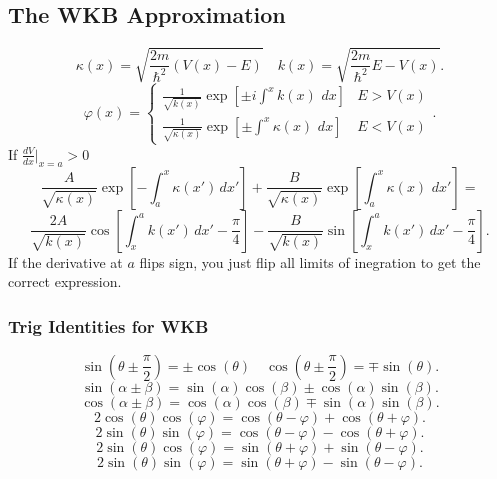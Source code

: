 \documentclass{article}
\begin{document}
  \subsection*{The WKB Approximation}
    \[
    \kappa(x) = \sqrt{\frac{2m}{\hbar^2}(V(x) - E)} \quad
    k(x) = \sqrt{\frac{2m}{\hbar^2} E - V(x)}
    .\]    
    \[
      \varphi(x) = 
      \begin{cases}
        \frac{1}{\sqrt{k(x)}} \exp[\pm i \int^x k(x)\,\,dx ]& E > V(x) \\
        \frac{1}{\sqrt{\kappa(x)}} \exp[\pm \int^x \kappa(x) \,\,dx] & E < V(x)
      \end{cases}
    .\] 
    If $\frac{d V}{dx}|_{x=a} > 0$ 
    \[
      \frac{A}{\sqrt{\kappa(x)}}\exp\left[ -\int_a^x \kappa(x')\,dx' \right] +
      \frac{B}{\sqrt{\kappa(x)}}\exp\left[\int_a^x \kappa(x)\,\,dx'\right] =
    \] 
    \[
      \frac{2A}{\sqrt{k(x)}}\cos\left[\int_x^a k(x')\,dx' - \frac{\pi}{4} \right] -
      \frac{B}{\sqrt{k(x)}}\sin\left[\int_x^a k(x')\,dx' - \frac{\pi}{4}\right]
    .\] 
    If the derivative at $a$ flips sign, you just flip all limits of inegration
    to get the correct expression.
    \subsubsection*{Trig Identities for WKB}
      \[
        \sin(\theta \pm \frac{ \pi}{2}) = \pm\cos(\theta) \quad
        \cos(\theta \pm \frac{\pi}{2}) = \mp\sin(\theta)
      .\] 
      \[
        \sin(\alpha \pm \beta) = \sin(\alpha)\cos(\beta) \pm \cos(\alpha)\sin(\beta)
      .\] 
      \[
        \cos(\alpha \pm \beta) = \cos(\alpha)\cos(\beta) \mp \sin(\alpha) \sin(\beta)
      .\] 
      \[
        2\cos(\theta)\cos(\varphi) = \cos(\theta - \varphi) + \cos(\theta + \varphi)
      .\] 
       \[
         2\sin(\theta)\sin(\varphi) = \cos(\theta - \varphi) - \cos(\theta + \varphi)
      .\] 
      \[
        2 \sin(\theta)\cos(\varphi) = \sin(\theta + \varphi) + \sin(\theta - \varphi)
      .\] 
      \[
        2\sin(\theta)\sin(\varphi) = \sin(\theta + \varphi) - \sin(\theta - \varphi)
      .\] 
\end{document}
